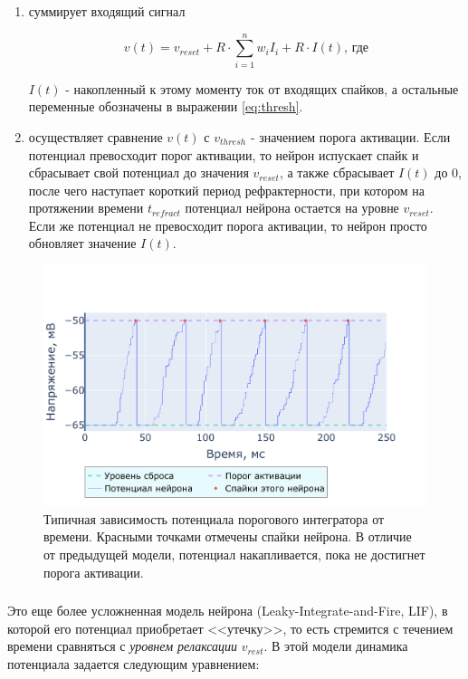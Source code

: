 \documentclass[a4paper]{article}
\begin{document}
\begin{enumerate}
 \item суммирует входящий сигнал

\begin{equation} \label{eq:if}
v(t) = v_{reset} + R \cdot \sum_{i=1}^n {w_i I_i} + R \cdot I(t) \text{, где}
\end{equation}

$I(t)$ - накопленный к этому моменту ток от входящих спайков, а остальные переменные обозначены в выражении \ref{eq:thresh}.

\item осуществляет сравнение $v(t)$ с $v_{thresh}$ - значением порога активации. Если потенциал превосходит порог активации, то нейрон испускает спайк и сбрасывает свой потенциал до значения $v_{reset}$, а также сбрасывает $I(t)$ до 0, после чего наступает короткий период рефрактерности, при котором на протяжении времени $t_{refract}$ потенциал нейрона остается на уровне $v_{reset}$. Если же потенциал не превосходит порога активации, то нейрон просто обновляет значение $I(t)$.
\end{enumerate}

\begin{center}
\begin{figure}[H] 
 \includegraphics[width=\textwidth,keepaspectratio=true]{model_if_ru.pdf}
 \caption{Типичная зависимость потенциала порогового интегратора от времени. Красными точками отмечены спайки нейрона. В отличие от предыдущей модели, потенциал накапливается, пока не достигнет порога активации.}
\end{figure}
\end{center} 

\subsubsection{}
Это еще более усложненная модель нейрона (Leaky-Integrate-and-Fire, LIF), в которой его потенциал приобретает <<утечку>>, то есть стремится с течением времени сравняться с \textit{уровнем релаксации} $v_{rest}$. В этой модели динамика потенциала задается следующим уравнением:
\end{document}
